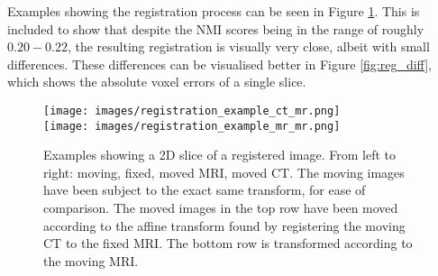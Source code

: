 \begin{table}[h!]
\centering
{}
\caption{CT-MRI registration results showing the MI score, for models trained on the different datasets. Rightmost column is MRI-MRI registration with baseline model for comparison. Bolded numbers denote the model with best performance for the relevant test set. Note that each test set here is spread out over two rows.}
\label{table:tuned_no_shear_MI_results}
\end{table}

Examples showing the registration process can be seen in Figure \ref{fig:reg_example}. This is included to show that despite the NMI scores being in the range of roughly $0.20-0.22$, the resulting registration is visually very close, albeit with small differences. These differences can be visualised better in Figure \ref{fig:reg_diff}, which shows the absolute voxel errors of a single slice.

\begin{figure}[h!]
\centering
\texttt{[image: images/registration\_example\_ct\_mr.png]}
\\
\texttt{[image: images/registration\_example\_mr\_mr.png]}
\caption{Examples showing a 2D slice of a registered image. From left to right: moving, fixed, moved MRI, moved CT. The moving images have been subject to the exact same transform, for ease of comparison. The moved images in the top row have been moved according to the affine transform found by registering the moving CT to the fixed MRI. The bottom row is transformed according to the moving MRI.}\label{fig:reg_example}
\end{figure}

